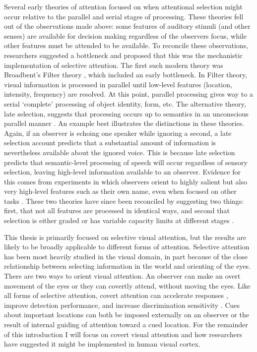 Several early theories of attention focused on when attentional selection might occur relative to the parallel and serial stages of processing. These theories fell out of the observations made above: some features of auditory stimuli (and other senses) are available for decision making regardless of the observers focus, while other features must be attended to be available. To reconcile these observations, researchers suggested a bottleneck and proposed that this was the mechanistic implementation of selective attention. The first such modern theory was Broadbent’s Filter theory \citep{Broadbent1958-ny}, which included an early bottleneck. In Filter theory, visual information is processed in parallel until low-level features (location, intensity, frequency) are resolved. At this point, parallel processing gives way to a serial ‘complete’ processing of object identity, form, etc. The alternative theory, late selection, suggests that processing occurs up to semantics in an unconscious parallel manner \citep{Deutsch1963-ac}. An example best illustrates the distinctions in these theories. Again, if an observer is echoing one speaker while ignoring a second, a late selection account predicts that a substantial amount of information is nevertheless available about the ignored voice. This is because late selection predicts that semantic-level processing of speech will occur regardless of sensory selection, leaving high-level information available to an observer. Evidence for this comes from experiments in which observers orient to highly salient but also very high-level features such as their own name, even when focused on other tasks \citep{Moray1959-fn}. These two theories have since been reconciled by suggesting two things: first, that not all features are processed in identical ways, and second that selection is either graded \citep{Treisman1960-qs} or has variable capacity limits at different stages \citep{Kahneman1973-af}.

This thesis is primarily focused on selective visual attention, but the results are likely to be broadly applicable to different forms of attention. Selective attention has been most heavily studied in the visual domain, in part because of the close relationship between selecting information in the world and orienting of the eyes. There are two ways to orient visual attention. An observer can make an overt movement of the eyes or they can covertly attend, without moving the eyes. Like all forms of selective attention, covert attention can accelerate responses \citep{Eriksen1972-qj,Posner1980-cr}, improve detection performance, and increase discrimination sensitivity \citep{Carrasco2011-xp}. Cues about important locations can both be imposed externally on an observer \citep{Posner1980-wb} or the result of internal guiding of attention toward a cued location. For the remainder of this introduction I will focus on covert visual attention and how researchers have suggested it might be implemented in human visual cortex.

